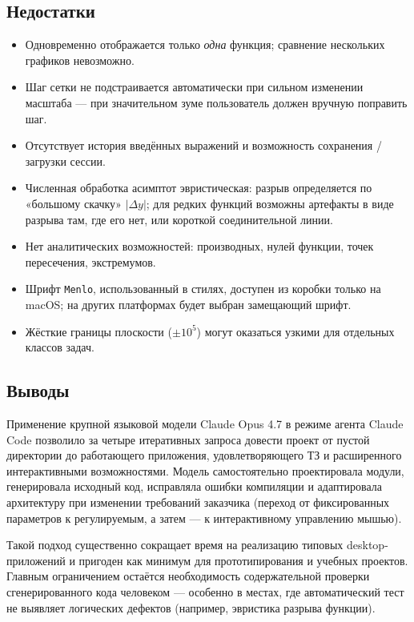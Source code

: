 \documentclass[a4paper, final]{article}
\begin{document}
\subsection{Недостатки}

\begin{itemize}
    \item Одновременно отображается только \emph{одна} функция;
          сравнение нескольких графиков невозможно.
    \item Шаг сетки не подстраивается автоматически при сильном
          изменении масштаба --- при значительном зуме пользователь
          должен вручную поправить шаг.
    \item Отсутствует история введённых выражений и возможность
          сохранения / загрузки сессии.
    \item Численная обработка асимптот эвристическая: разрыв определяется
          по «большому скачку» $|\Delta y|$; для редких функций возможны
          артефакты в виде разрыва там, где его нет, или короткой
          соединительной линии.
    \item Нет аналитических возможностей: производных, нулей функции,
          точек пересечения, экстремумов.
    \item Шрифт \texttt{Menlo}, использованный в стилях, доступен
          из коробки только на macOS; на других платформах будет
          выбран замещающий шрифт.
    \item Жёсткие границы плоскости ($\pm 10^5$) могут оказаться
          узкими для отдельных классов задач.
\end{itemize}

\subsection{Выводы}

Применение крупной языковой модели Claude Opus 4.7 в режиме агента
Claude Code позволило за четыре итеративных запроса довести проект
от пустой директории до работающего приложения, удовлетворяющего ТЗ
и расширенного интерактивными возможностями. Модель самостоятельно
проектировала модули, генерировала исходный код, исправляла ошибки
компиляции и адаптировала архитектуру при изменении требований
заказчика (переход от фиксированных параметров к регулируемым,
а затем --- к интерактивному управлению мышью).

Такой подход существенно сокращает время на реализацию типовых
desktop-приложений и пригоден как минимум для прототипирования
и учебных проектов. Главным ограничением остаётся необходимость
содержательной проверки сгенерированного кода человеком ---
особенно в местах, где автоматический тест не выявляет логических
дефектов (например, эвристика разрыва функции).
\end{document}
